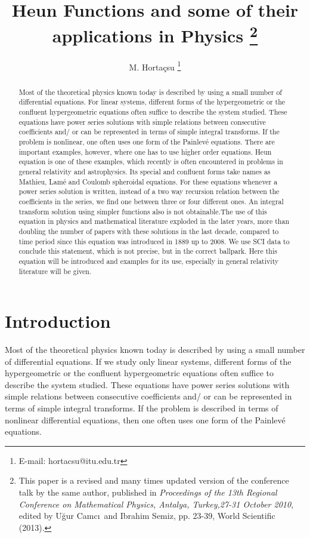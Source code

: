 \documentclass{article}
\begin{document}
\title{Heun Functions and some of their applications in Physics  \footnote{This paper is a revised and many times updated version of the conference talk by the same author,  published in \textit{Proceedings of the 13th Regional Conference on
Mathematical Physics, Antalya, Turkey,27-31 October 2010}, edited
by U\u{g}ur Camc\i\ and Ibrahim Semiz, pp. 23-39, World Scientific (2013).} }
\author{M. Horta\c{c}su \footnote{E-mail: hortacsu@itu.edu.tr}}
\maketitle
\begin{abstract}
\noindent Most of the theoretical physics known today is described by
using a small number of differential equations. For linear
systems, different forms of the hypergeometric or the confluent
hypergeometric equations often suffice to describe the system
studied. These equations have power series solutions with simple
relations between consecutive coefficients and/ or can be
represented in terms of simple integral transforms. If the problem
is nonlinear, one often uses one form of the Painlev\'{e}
equations. There are important examples, however, where one has to
use higher order equations. Heun equation is one of these
examples, which recently is often encountered in problems in
general relativity and astrophysics. Its special and confluent
forms take names as Mathieu, Lam\'{e} and Coulomb spheroidal
 equations. For these equations whenever a power series solution is
written, instead of a two way recursion relation between the
coefficients in the series, we find one between three or four
different ones. An integral transform solution using simpler
functions also is not obtainable.The use of this equation in physics and mathematical literature
exploded in the later years, more than doubling the number of papers with these solutions
in the last decade, compared to time period since this equation was introduced in 1889 up to 2008.
We use SCI data to conclude this statement, which is not precise, but in the correct ballpark.
 Here this equation will be
introduced and examples for its use, especially in general
relativity literature will be given.
\end{abstract}

\newpage

\section{Introduction}
\noindent Most of the theoretical physics known today is described by
using a small number of differential equations. If we study only
linear systems, different forms of the hypergeometric or the
confluent hypergeometric equations often suffice to describe the
system studied. These equations have power series solutions with
simple relations between consecutive coefficients and/ or can be
represented in terms of simple integral transforms. If the problem
is described in terms of  nonlinear differential equations, then
one often uses one form of the Painlev\'{e} equations.
\end{document}
